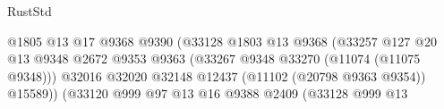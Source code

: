 \begin{lexlean}{RustStd}
\begin{coremodule}
                                                              @1805
                                                              @13
                                                              @17
                                                              @9368
                                                              @9390
                                                              (@33128
                                                                @1803
                                                                @13
                                                                @9368
                                                                (@33257
                                                                  @127
                                                                  @20
                                                                  @13
                                                                  @9348
                                                                  @2672
                                                                  @9353
                                                                  @9363
                                                                  (@33267
                                                                    @9348
                                                                    @33270
                                                                    (@11074 (@11075 @9348)))
                                                                  @32016
                                                                  @32020
                                                                  @32148
                                                                  @12437
                                                                  (@11102 (@20798 @9363 @9354))
                                                                  @15589))
                                                              (@33120
                                                                @999
                                                                @97
                                                                @13
                                                                @16
                                                                @9388
                                                                @2409
                                                                (@33128
                                                                  @999
                                                                  @13

\end{coremodule}
\end{lexlean}
